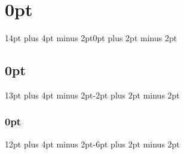 

\newcommand{\subsubsubsection}[1]{\bigskip\noindent{\color{black!70!white}\small\HeadingsFont\bfseries\itshape #1} \\}


\titlespacing\section{0pt}{14pt plus 4pt minus 2pt}{0pt plus 2pt minus 2pt}
\titlespacing\subsection{0pt}{13pt plus 4pt minus 2pt}{-2pt plus 2pt minus 2pt}
\titlespacing\subsubsection{0pt}{12pt plus 4pt minus 2pt}{-6pt plus 2pt minus 2pt}














\RequirePackage{scrlayer-scrpage}       %
\setlength{\headheight}{115pt}			%


